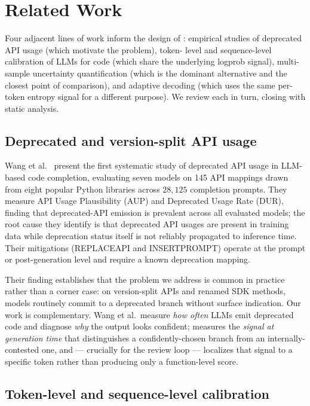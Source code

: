 \section{Related Work}
\label{sec:related}

Four adjacent lines of work inform the design of \eps: empirical
studies of deprecated API usage (which motivate the problem), token-%
level and sequence-level calibration of LLMs for code (which share
the underlying logprob signal), multi-sample uncertainty
quantification (which is the dominant alternative and the closest
point of comparison), and adaptive decoding (which uses the same
per-token entropy signal for a different purpose). We review each in
turn, closing with static analysis.

\subsection{Deprecated and version-split API usage}
\label{subsec:related-deprecated}

Wang et al.~\cite{wang2025deprecated} present the first systematic
study of deprecated API usage in LLM-based code completion, evaluating
seven models on 145 API mappings drawn from eight popular Python
libraries across $28{,}125$ completion prompts. They measure API
Usage Plausibility (AUP) and Deprecated Usage Rate (DUR), finding
that deprecated-API emission is prevalent across all evaluated
models; the root cause they identify is that deprecated API usages
are present in training data while deprecation status itself is not
reliably propagated to inference time. Their mitigations (REPLACEAPI
and INSERTPROMPT) operate at the prompt or post-generation level and
require a known deprecation mapping.

Their finding establishes that the problem we address is common in
practice rather than a corner case: on version-split APIs and renamed
SDK methods, models routinely commit to a deprecated branch without
surface indication. Our work is complementary. Wang et al.\ measure
\emph{how often} LLMs emit deprecated code and diagnose \emph{why}
the output looks confident; \eps measures the \emph{signal at
generation time} that distinguishes a confidently-chosen branch from
an internally-contested one, and --- crucially for the review loop
--- localizes that signal to a specific token rather than producing
only a function-level score.

\subsection{Token-level and sequence-level calibration}
\label{subsec:related-calibration}

